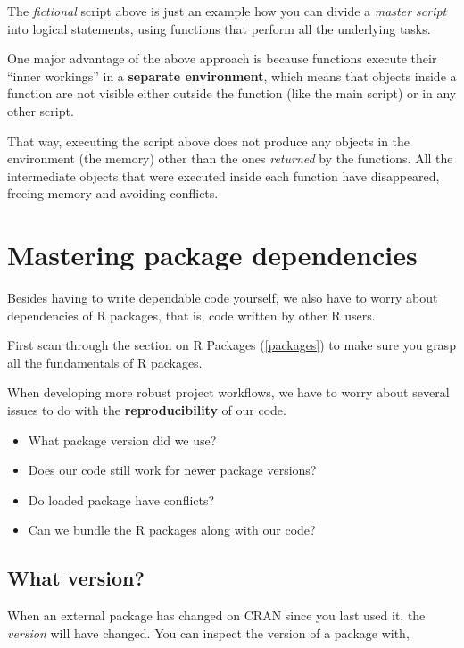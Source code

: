 \documentclass[]{book}
\providecommand{\tightlist}{%
  \setlength{\itemsep}{0pt}\setlength{\parskip}{0pt}}
\let\BeginKnitrBlock\begin \let\EndKnitrBlock\end
\begin{document}
The \emph{fictional} script above is just an example how you can divide a \emph{master script} into logical statements, using functions that perform all the underlying tasks.

One major advantage of the above approach is because functions execute their ``inner workings'' in a \textbf{separate environment}, which means that objects inside a function are not visible either outside the function (like the main script) or in any other script.

That way, executing the script above does not produce any objects in the environment (the memory) other than the ones \emph{returned} by the functions. All the intermediate objects that were executed inside each function have disappeared, freeing memory and avoiding conflicts.

\hypertarget{masteringpackages}{%
\chapter{Mastering package dependencies}\label{masteringpackages}}

Besides having to write dependable code yourself, we also have to worry about dependencies of R packages, that is, code written by other R users.

\BeginKnitrBlock{rmdreading}
First scan through the section on R Packages (\ref{packages}) to make sure you grasp all the fundamentals of R packages.
\EndKnitrBlock{rmdreading}

When developing more robust project workflows, we have to worry about several issues to do with the \textbf{reproducibility} of our code.

\begin{itemize}
\tightlist
\item
  What package version did we use?
\item
  Does our code still work for newer package versions?
\item
  Do loaded package have conflicts?
\item
  Can we bundle the R packages along with our code?
\end{itemize}

\hypertarget{what-version}{%
\section{What version?}\label{what-version}}

When an external package has changed on CRAN since you last used it, the \emph{version} will have changed. You can inspect the version of a package with,
\end{document}
